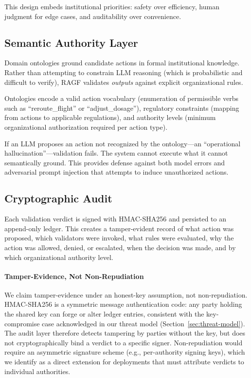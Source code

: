 \documentclass[sigconf,nonacm]{acmart}
\begin{document}
This design embeds institutional priorities: safety over efficiency, human judgment for edge cases, and auditability over convenience.

\subsection{Semantic Authority Layer}

Domain ontologies ground candidate actions in formal institutional knowledge. Rather than attempting to constrain LLM reasoning (which is probabilistic and difficult to verify), RAGF validates \emph{outputs} against explicit organizational rules.

Ontologies encode a valid action vocabulary (enumeration of permissible verbs such as ``reroute\_flight'' or ``adjust\_dosage''), regulatory constraints (mapping from actions to applicable regulations), and authority levels (minimum organizational authorization required per action type).

If an LLM proposes an action not recognized by the ontology---an ``operational hallucination''---validation fails. The system cannot execute what it cannot semantically ground. This provides defense against both model errors and adversarial prompt injection that attempts to induce unauthorized actions.

\subsection{Cryptographic Audit}

Each validation verdict is signed with HMAC-SHA256 and persisted to an append-only ledger. This creates a tamper-evident record of what action was proposed, which validators were invoked, what rules were evaluated, why the action was allowed, denied, or escalated, when the decision was made, and by which organizational authority level.

\paragraph{Tamper-Evidence, Not Non-Repudiation} We claim tamper-evidence under an honest-key assumption, not non-repudiation. HMAC-SHA256 is a symmetric message authentication code: any party holding the shared key can forge or alter ledger entries, consistent with the key-compromise case acknowledged in our threat model (Section~\ref{sec:threat-model}). The audit layer therefore detects tampering by parties without the key, but does not cryptographically bind a verdict to a specific signer. Non-repudiation would require an asymmetric signature scheme (e.g., per-authority signing keys), which we identify as a direct extension for deployments that must attribute verdicts to individual authorities.
\end{document}
